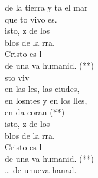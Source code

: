 \documentclass[12pt]{article}
\begin{document}
\begin{multicols*}{2}
\begin{cancion}
\begin{chorus}
	de la tierra y ta el mar\\
	que to vivo es. \\
\jump
	isto, z de los \\
	blos de la rra.\\
	Cristo es l \\
	de una va humanid. (**)\\
	sto viv\\
	en las les, las ciudes,\\
	en losntes y en los lles,\\
	en da coran (**) \\
	isto, z de los \\
	blos de la rra.\\
	Cristo es l \\
	de una va humanid. (**)\\
	… de unueva hanad.\\
	\end{chorus}%
	\jump\\
\end{cancion}%


\end{multicols*}
\end{document}
